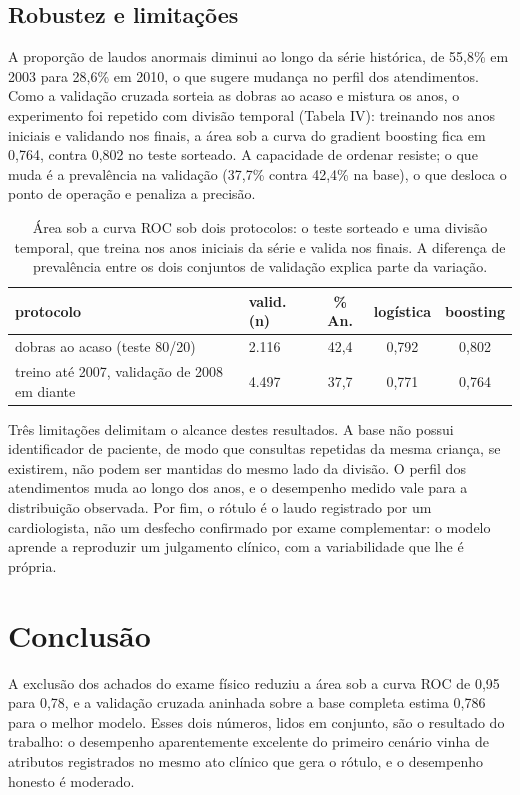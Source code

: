 \documentclass[conference]{IEEEtran}
\begin{document}
\subsection{Robustez e limitações}
A proporção de laudos anormais diminui ao longo da série histórica, de 55,8\% em 2003 para 28,6\% em 2010, o que sugere mudança no perfil dos atendimentos. Como a validação cruzada sorteia as dobras ao acaso e mistura os anos, o experimento foi repetido com divisão temporal (Tabela IV): treinando nos anos iniciais e validando nos finais, a área sob a curva do gradient boosting fica em 0,764, contra 0,802 no teste sorteado. A capacidade de ordenar resiste; o que muda é a prevalência na validação (37,7\% contra 42,4\% na base), o que desloca o ponto de operação e penaliza a precisão.

\begin{table}[!t]
\caption{Área sob a curva ROC sob dois protocolos: o teste sorteado e uma divisão temporal, que treina nos anos iniciais da série e valida nos finais. A diferença de prevalência entre os dois conjuntos de validação explica parte da variação.}
\label{tab:deriva_temporal}
\centering
\small
\begin{tabular}{llccc}
\toprule
protocolo & valid. (n) & \% An. & logística & boosting \\
\midrule
dobras ao acaso (teste 80/20) & 2.116 & 42,4 & 0,792 & 0,802 \\
treino até 2007, validação de 2008 em diante & 4.497 & 37,7 & 0,771 & 0,764 \\
\bottomrule
\end{tabular}
\end{table}
Três limitações delimitam o alcance destes resultados. A base não possui identificador de paciente, de modo que consultas repetidas da mesma criança, se existirem, não podem ser mantidas do mesmo lado da divisão. O perfil dos atendimentos muda ao longo dos anos, e o desempenho medido vale para a distribuição observada. Por fim, o rótulo é o laudo registrado por um cardiologista, não um desfecho confirmado por exame complementar: o modelo aprende a reproduzir um julgamento clínico, com a variabilidade que lhe é própria.

\section{Conclusão}
A exclusão dos achados do exame físico reduziu a área sob a curva ROC de 0,95 para 0,78, e a validação cruzada aninhada sobre a base completa estima 0,786 para o melhor modelo. Esses dois números, lidos em conjunto, são o resultado do trabalho: o desempenho aparentemente excelente do primeiro cenário vinha de atributos registrados no mesmo ato clínico que gera o rótulo, e o desempenho honesto é moderado.
\end{document}
